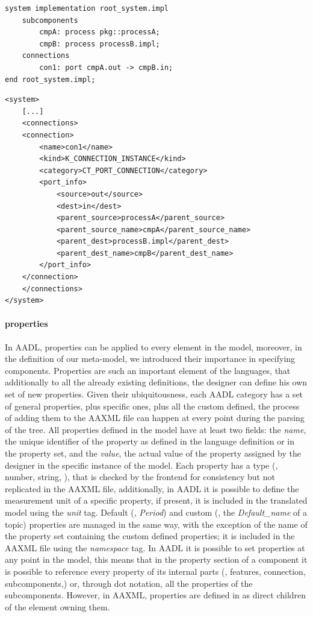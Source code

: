 \begin{lstlisting}[frame=tb,caption={TODO caption},label=lst:con-aadl]
system implementation root_system.impl
	subcomponents
		cmpA: process pkg::processA;
		cmpB: process processB.impl;
	connections
		con1: port cmpA.out -> cmpB.in;
end root_system.impl;
\end{lstlisting}

\begin{lstlisting}[frame=tb,caption={TODO caption},label=lst:con-aaxml]
<system>
	[...]
	<connections>
	<connection>
		<name>con1</name>
		<kind>K_CONNECTION_INSTANCE</kind>
		<category>CT_PORT_CONNECTION</category>
		<port_info>
			<source>out</source>
			<dest>in</dest>
			<parent_source>processA</parent_source>
			<parent_source_name>cmpA</parent_source_name>
			<parent_dest>processB.impl</parent_dest>
			<parent_dest_name>cmpB</parent_dest_name>
		</port_info>
	</connection>
	</connections>
</system>
\end{lstlisting}

\paragraph{properties} In AADL, properties can be applied to every element in the model, moreover, in the definition of our meta-model, we introduced their importance in specifying components. Properties are such an important element of the languages, that additionally to all the already existing definitions, the designer can define his own set of new properties. Given their ubiquitousness, each AADL category has a set of general properties, plus specific ones, plus all the custom defined, the process of adding them to the AAXML file can happen at every point during the parsing of the tree. All properties defined in the model have at least two fields: the \textit{name}, the unique identifier of the property as defined in the language definition or in the property set, and the \textit{value}, the actual value of the property assigned by the designer in the specific instance of the model. Each property has a type (\eg, number, string, \etc), that is checked by the frontend for consistency but not replicated in the AAXML file, additionally, in AADL it is possible to define the measurement unit of a specific property, if present, it is included in the translated model using the \textit{unit} tag. Default (\eg, \textit{Period}) and custom (\eg, the \textit{Default\_name} of a topic) properties are managed in the same way, with the exception of the name of the property set containing the custom defined properties; it is included in the AAXML file using the \textit{namespace} tag. In AADL it is possible to set properties at any point in the model, this means that in the property section of a component it is possible to reference every property of its internal parts (\eg, features, connection, subcomponents,\etc) or, through dot notation, all the properties of the subcomponents. However, in AAXML, properties are defined in as direct children of the element owning them.

